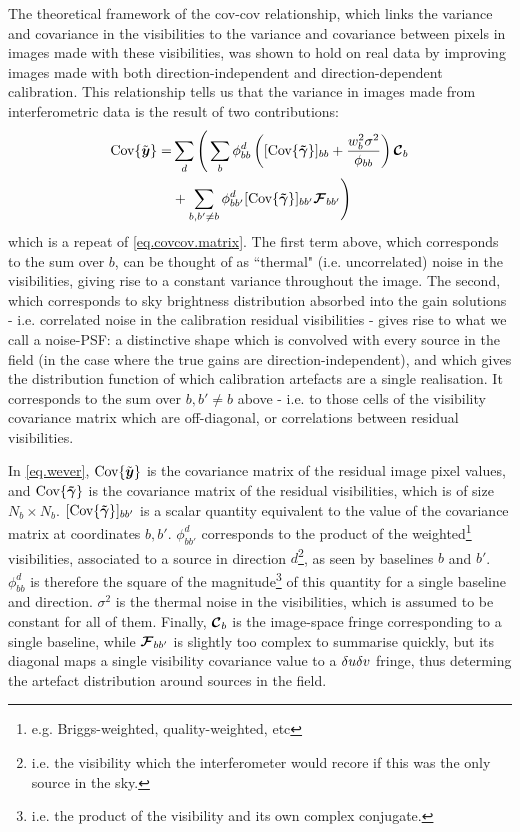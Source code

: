 \pg
The theoretical framework of the cov-cov relationship, which links the variance and covariance in the visibilities to the variance and covariance between pixels in images made with these visibilities, was shown to hold on real data by improving images made with both direction-independent and direction-dependent calibration. This relationship tells us that the variance in images made from interferometric data is the result of two contributions:
\begin{align}
\textrm{Cov}\{\tilde{\bm{{{y}}}}\} =& \sum_d \Bigg(\sum_b \phi_{bb}^d \left( [\textrm{Cov}\{\bm{\tilde{\gamma}}\}]_{bb} + \frac{w_b^2 \sigma^2}{\phi_{bb}} \right) \bm{\mathcal{C}}_b\nonumber\\
              &+ \sum_{b,b'\ne b}  \phi_{bb'}^d [\textrm{Cov}\{\bm{\tilde{\gamma}}\}]_{bb'} \bm{\mathcal{F}}_{bb'} \Bigg)\label{eq.wever}
\end{align}
which is a repeat of \cref{eq.covcov.matrix}.  
The first term above, which corresponds to the sum over $b$, can be thought of as ``thermal" (i.e. uncorrelated) noise in the visibilities, giving rise to a constant variance throughout the image. The second, which corresponds to sky brightness distribution absorbed into the gain solutions - i.e. correlated noise in the calibration residual visibilities - gives rise to what we call a noise-PSF: a distinctive shape which is convolved with every source in the field (in the case where the true gains are direction-independent), and which gives the distribution function of which calibration artefacts are a single realisation. It corresponds to the sum over $b,b'\ne b$ above - i.e. to those cells of the visibility covariance matrix which are off-diagonal, or correlations between residual visibilities.

\pg
In \cref{eq.wever}, $\textrm{Cov}\{\tilde{\bm{{{y}}}}\}$ is the covariance matrix of the residual image pixel values, and $\textrm{Cov}\{\bm{\tilde{\gamma}}\}$ is the covariance matrix of the residual visibilities, which is of size $N_b\times N_b$. $[\textrm{Cov}\{\bm{\tilde{\gamma}}\}]_{bb'}$ is a scalar quantity equivalent to the value of the covariance matrix at coordinates $b,b'$. $\phi_{bb'}^d$ corresponds to the product of the weighted\footnote{e.g. Briggs-weighted, quality-weighted, etc} visibilities, associated to a source in direction $d$\footnote{i.e. the visibility which the interferometer would recore if this was the only source in the sky.}, as seen by baselines $b$ and $b'$. $\phi_{bb}^d$ is therefore the square of the magnitude\footnote{i.e. the product of the visibility and its own complex conjugate.} of this quantity for a single baseline and direction. $\sigma^2$ is the thermal noise in the visibilities, which is assumed to be constant for all of them. Finally, $\bm{\mathcal{C}}_b$ is the image-space fringe corresponding to a single baseline, while $\bm{\mathcal{F}}_{bb'}$ is slightly too complex to summarise quickly, but its diagonal maps a single visibility covariance value to a $\delta u\delta v$ fringe, thus determing the artefact distribution around sources in the field.

